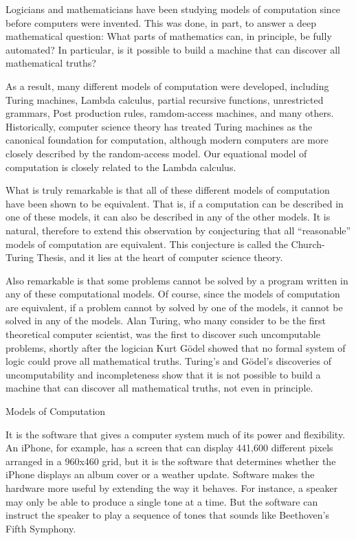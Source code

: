 \begin{aside}
Logicians and mathematicians have been studying models of computation
since before computers were invented. This was done, in part, to
answer a deep mathematical question: What parts of mathematics can,
in principle, be fully automated?  In particular, is it possible to
build a machine that can discover all mathematical truths?

As a result, many different models of computation were developed,
including Turing machines, Lambda calculus, partial recursive
functions, unrestricted grammars, Post production rules, ramdom-access
machines, and many others.  Historically, computer science theory has
treated Turing machines as the canonical foundation for computation,
although modern computers are more closely described by the
random-access model.  Our equational model of computation is closely
related to the Lambda calculus.

What is truly remarkable is that all of these different models of 
computation have been shown to be equivalent.  That is,
if a computation can be described in one of these models, it can also
be described in any of the other models.  It is natural, therefore to
extend this observation by conjecturing that all ``reasonable'' models
of computation are equivalent.  This conjecture is called the
Church-Turing Thesis, and it lies at the heart of computer science
theory.

Also remarkable is that some problems cannot be solved by a program
written in any of these computational models.  Of course, since the
models of computation are equivalent, if a problem cannot by solved by
one of the models, it cannot be solved in any of the models.  Alan
Turing, who many consider to be the first theoretical computer
scientist, was the first to discover such uncomputable problems,
shortly after the logician Kurt G\"odel showed that no formal system
of logic could prove all mathematical truths.  Turing's and G\"odel's 
discoveries of uncomputability and incompleteness show that it is
not possible to build a machine that can discover all mathematical
truths, not even in principle.

\caption{Models of Computation}
\label{aside-model-of-computation}
\end{aside}

It is the software that gives a computer system much of its power and
flexibility. An iPhone, for example, has a screen that
can display 441,600 different pixels arranged in a 960x460
grid, but it is the software that determines whether the
iPhone displays an album cover or a weather update. 
Software makes the hardware more useful by extending the way
it behaves. For instance, a speaker may only be able to produce a
single tone at a time. But the software can instruct the speaker to
play a sequence of tones that sounds like Beethoven's Fifth Symphony.

